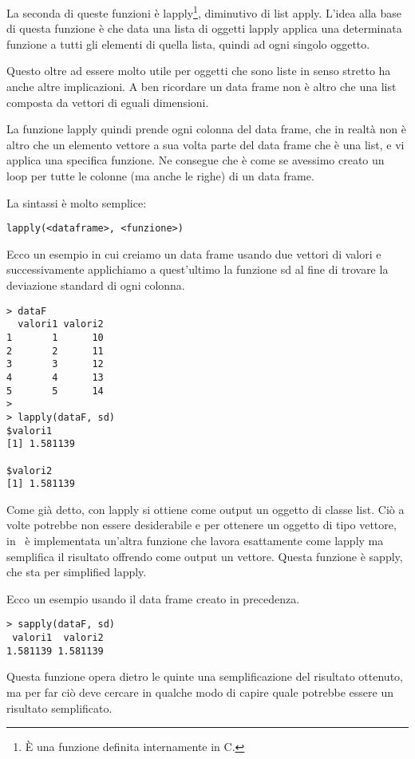 La seconda di queste funzioni è \textsf{lapply}\footnote{È una funzione definita internamente in C.}, diminutivo di list apply. L'idea alla base di questa funzione è che data una lista di oggetti \textsf{lapply} applica una determinata funzione a tutti gli elementi di quella lista, quindi ad ogni singolo oggetto.

Questo oltre ad essere molto utile per oggetti che sono liste in senso stretto ha anche altre implicazioni. A ben ricordare un data frame non è altro che una list composta da vettori di eguali dimensioni.

La funzione lapply quindi prende ogni colonna del data frame, che in realtà non è altro che un elemento vettore a sua volta parte del data frame che è una list, e vi applica una specifica funzione. Ne consegue che è come se avessimo creato un loop per tutte le colonne (ma anche le righe) di un data frame.

La sintassi è molto semplice:
\begin{lstlisting}
lapply(<dataframe>, <funzione>)
\end{lstlisting}

Ecco un esempio in cui creiamo un data frame usando due vettori di valori e successivamente applichiamo a quest'ultimo la funzione \textsf{sd} al fine di trovare la deviazione standard di ogni colonna.

\begin{lstlisting}
> dataF
  valori1 valori2
1       1      10
2       2      11
3       3      12
4       4      13
5       5      14
>
> lapply(dataF, sd)
$valori1
[1] 1.581139

$valori2
[1] 1.581139
\end{lstlisting}

Come già detto, con \textsf{lapply} si ottiene come output un oggetto di classe list. Ciò a volte potrebbe non essere desiderabile e per ottenere un oggetto di tipo vettore, in \erre\ è implementata un'altra funzione che lavora esattamente come \textsf{lapply} ma semplifica il risultato offrendo come output un vettore. Questa funzione è \textsf{sapply}, che sta per simplified lapply.

Ecco un esempio usando il data frame creato in precedenza.

\begin{lstlisting}
> sapply(dataF, sd)
 valori1  valori2 
1.581139 1.581139 
\end{lstlisting}

Questa funzione opera dietro le quinte una semplificazione del risultato ottenuto, ma per far ciò deve cercare in qualche modo di capire quale potrebbe essere un risultato semplificato.

